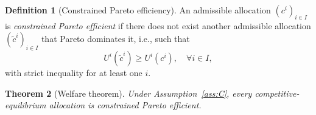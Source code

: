 \documentclass[11pt,a4paper,oneside]{book}
\def\geq{\geqslant}
\theoremstyle{plain}
\newtheorem{theorem}{Theorem}[chapter]
\theoremstyle{definition}
\newtheorem{definition}[theorem]{Definition}
\theoremstyle{remark}
\numberwithin{equation}{chapter}
\begin{document}
\begin{definition}[Constrained Pareto efficiency]\label{def:constrained-pareto}
An admissible allocation $(c^i)_{i \in I}$ is \emph{constrained Pareto efficient} if there does not exist another admissible allocation $(\widetilde{c}^i)_{i \in I}$ that Pareto dominates it, i.e., such that
\begin{equation*}
  U^i(\widetilde{c}^i) \geq U^i(c^i), \quad \forall i \in I,
\end{equation*}
with strict inequality for at least one $i$.
\end{definition}

\begin{theorem}[Welfare theorem]\label{thm:welfare-BGR}
Under Assumption~\ref{ass:C}, every competitive-equilibrium allocation is constrained Pareto efficient.
\end{theorem}
\end{document}
